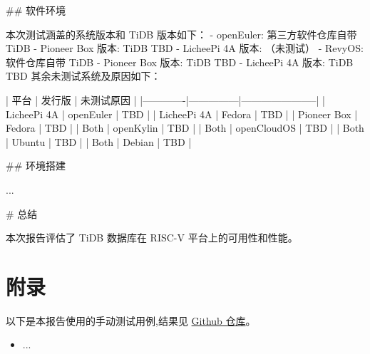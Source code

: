 \documentclass{article}
\begin{document}
\begin{markdown}
## 软件环境

本次测试涵盖的系统版本和 TiDB 版本如下：
- openEuler: 第三方软件仓库自带 TiDB 
  - Pioneer Box 版本: TiDB TBD
  - LicheePi 4A 版本: （未测试）
- RevyOS: 软件仓库自带 TiDB
  - Pioneer Box 版本: TiDB TBD
  - LicheePi 4A 版本: TiDB TBD
  其余未测试系统及原因如下：

  | 平台        | 发行版        | 未测试原因              |
  |-------------|---------------|-----------------------|
  | LicheePi 4A | openEuler     | TBD                   |
  | LicheePi 4A | Fedora        | TBD                   |
  | Pioneer Box | Fedora        | TBD                   |
  | Both        | openKylin     | TBD                   |
  | Both        | openCloudOS   | TBD                   |
  | Both        | Ubuntu        | TBD                   |
  | Both        | Debian        | TBD                   |

## 环境搭建

...

# 总结

本次报告评估了 TiDB 数据库在 RISC-V 平台上的可用性和性能。

\end{markdown}

\newpage
\section{附录}

\appendix

以下是本报告使用的手动测试用例,结果见 \href{https://github.com/QA-Team-lo/dbtest}{Github 仓库}。

\begin{itemize}
    \item ...
\end{itemize}

\end{document}
